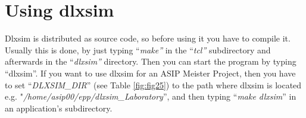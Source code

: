 \hypertarget{using-dlxsim}{%
\section{Using dlxsim}\label{using-dlxsim}}

Dlxsim is distributed as source code, so before using it you have to
compile it. Usually this is done, by just typing ``\emph{make''} in the
``\emph{tcl''} subdirectory and afterwards in the ``\emph{dlxsim''}
directory. Then you can start the program by typing ``dlxsim''. If you
want to use dlxsim for an ASIP Meister Project, then you have to set
``\emph{DLXSIM\_DIR}'' (see Table \ref{fig:fig25}) to
the path where dlxsim is located e.g.
"\emph{/home/asip00/epp/dlxsim\_Laboratory}'', and then typing
``\emph{make dlxsim}'' in an application's subdirectory.

